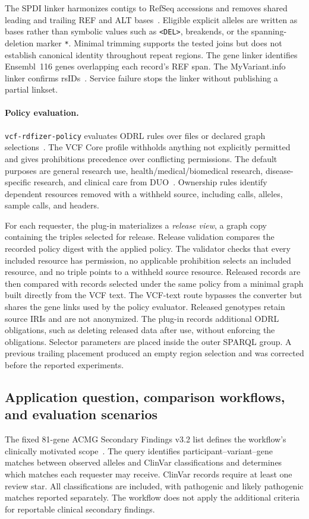 \documentclass[11pt]{article}
\begin{document}
The SPDI linker harmonizes contigs to RefSeq accessions and removes shared leading and trailing REF and ALT bases~\cite{holmes2020spdi}.
Eligible explicit alleles are written as bases rather than symbolic values such as \texttt{<DEL>}, breakends, or the spanning-deletion marker \texttt{*}.
Minimal trimming supports the tested joins but does not establish canonical identity throughout repeat regions.
The gene linker identifies Ensembl~116 genes overlapping each record's REF span.
The MyVariant.info linker confirms rsIDs~\cite{xin2016myvariant}.
Service failure stops the linker without publishing a partial linkset.

\paragraph{Policy evaluation.}
\texttt{vcf-rdfizer-policy} evaluates ODRL rules over files or declared graph selections~\cite{odrl_2018}.
The VCF Core profile withholds anything not explicitly permitted and gives prohibitions precedence over conflicting permissions.
The default purposes are general research use, health/medical/biomedical research, disease-specific research, and clinical care from DUO~\cite{lawson2021duo}.
Ownership rules identify dependent resources removed with a withheld source, including calls, alleles, sample calls, and headers.

For each requester, the plug-in materializes a \emph{release view}, a graph copy containing the triples selected for release.
Release validation compares the recorded policy digest with the applied policy.
The validator checks that every included resource has permission, no applicable prohibition selects an included resource, and no triple points to a withheld source resource.
Released records are then compared with records selected under the same policy from a minimal graph built directly from the VCF text.
The VCF-text route bypasses the converter but shares the gene links used by the policy evaluator.
Released genotypes retain source IRIs and are not anonymized.
The plug-in records additional ODRL obligations, such as deleting released data after use, without enforcing the obligations.
Selector parameters are placed inside the outer SPARQL group.
A previous trailing placement produced an empty region selection and was corrected before the reported experiments.

\subsection{Application question, comparison workflows, and evaluation scenarios}\label{subsec:usecase-case}
The fixed 81-gene ACMG Secondary Findings v3.2 list defines the workflow's clinically motivated scope~\cite{miller2023acmg}.
The query identifies participant--variant--gene matches between observed alleles and ClinVar classifications and determines which matches each requester may receive.
ClinVar records require at least one review star.
All classifications are included, with pathogenic and likely pathogenic matches reported separately.
The workflow does not apply the additional criteria for reportable clinical secondary findings.
\end{document}
